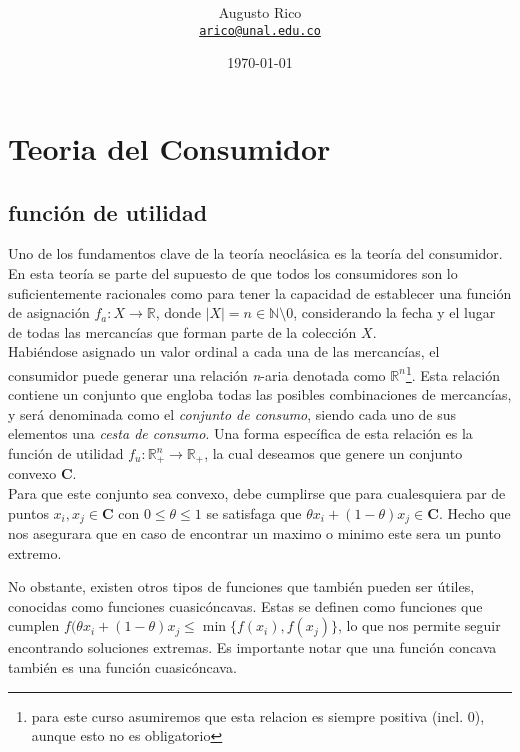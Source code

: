 \documentclass[11pt]{article}
\title{\text{Microeconomia III - $1^a$ Monitoria}
}
\author{Augusto Rico\\%
    \href{mailto:arico@unal.edu.co}{\texttt{arico@unal.edu.co}}
    }
\date{\today}
\begin{document}
\maketitle


\section{Teoria del Consumidor}
\subsection{función de utilidad}

\begin{flushleft}
    Uno de los fundamentos clave de la teoría neoclásica es la teoría del consumidor. En esta teoría se parte del supuesto de que todos los consumidores son lo suficientemente racionales como para tener la capacidad de establecer una función de asignación $f_a: X \to \mathbb{R}$, donde $|X| = n \in \mathbb{N} \setminus {0}$, considerando la fecha y el lugar de todas las mercancías que forman parte de la colección $X$.\\
    Habiéndose asignado un valor ordinal a cada una de las mercancías, el consumidor puede generar una relación \textit{n}-aria denotada como $\mathbb{R}^n$\footnote{para este curso asumiremos que esta relacion es siempre positiva (incl. 0), aunque esto no es obligatorio}. Esta relación contiene un conjunto que engloba todas las posibles combinaciones de mercancías, y será denominada como el \textit{conjunto de consumo}, siendo cada uno de sus elementos una \textit{cesta de consumo}. Una forma específica de esta relación es la función de utilidad $f_u:\mathbb{R}_+^n\to\mathbb{R_+}$, la cual deseamos que genere un conjunto convexo $\mathbf{C}$.\\
    Para que este conjunto sea convexo, debe cumplirse que para cualesquiera par de puntos $x_i,x_j\in\mathbf{C}$ con $0\leq\theta\leq1$ se satisfaga que $\theta x_i+(1-\theta)x_j \in \mathbf{C}$. Hecho que nos asegurara que en caso de encontrar un maximo o minimo este sera un punto extremo.
    
    No obstante, existen otros tipos de funciones que también pueden ser útiles, conocidas como funciones cuasicóncavas. Estas se definen como funciones que cumplen $f(\theta x_i+(1-\theta)x_j \leq \min\{f(x_i),f(x_j)\}$, lo que nos permite seguir encontrando soluciones extremas.
    Es importante notar que una función concava también es una función cuasicóncava.

\end{flushleft}
\end{document}
